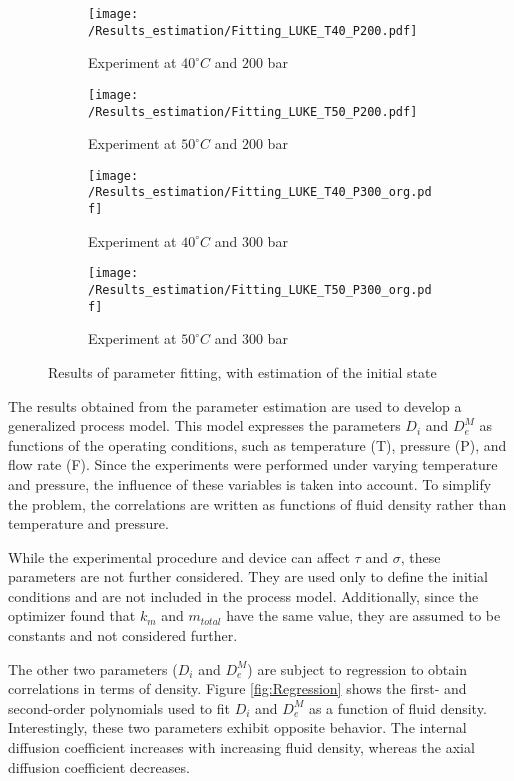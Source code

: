 \documentclass[../Article_Model_Parameters.tex]{subfiles}
\begin{document}
		\begin{figure}[!h]
		\centering
		\begin{subfigure}[b]{\columnwidth}
			\centering
			\texttt{[image: /Results\_estimation/Fitting\_LUKE\_T40\_P200.pdf]}
			\caption{Experiment at $40^\circ C$ and $200$ bar}
		\end{subfigure}
		\begin{subfigure}[b]{\columnwidth}
			\centering
			\texttt{[image: /Results\_estimation/Fitting\_LUKE\_T50\_P200.pdf]}
			\caption{Experiment at $50^\circ C$ and $200$ bar}
		\end{subfigure}
		\begin{subfigure}[b]{\columnwidth}
			\centering
			\texttt{[image: /Results\_estimation/Fitting\_LUKE\_T40\_P300\_org.pdf]}
			\caption{Experiment at $40^\circ C$ and $300$ bar}
		\end{subfigure}
		\begin{subfigure}[b]{\columnwidth}
			\centering
			\texttt{[image: /Results\_estimation/Fitting\_LUKE\_T50\_P300\_org.pdf]}
			\caption{Experiment at $50^\circ C$ and $300$ bar}
		\end{subfigure}
		\caption{Results of parameter fitting, with estimation of the initial state}
		\label{fig: estimation_results}
	\end{figure}

	The results obtained from the parameter estimation are used to develop a generalized process model. This model expresses the parameters $D_i$ and $D_e^M$ as functions of the operating conditions, such as temperature (T), pressure (P), and flow rate (F). Since the experiments were performed under varying temperature and pressure, the influence of these variables is taken into account. To simplify the problem, the correlations are written as functions of fluid density rather than temperature and pressure.
	
	While the experimental procedure and device can affect $\tau$ and $\sigma$, these parameters are not further considered. They are used only to define the initial conditions and are not included in the process model. Additionally, since the optimizer found that $k_m$ and $m_{total}$ have the same value, they are assumed to be constants and not considered further.
	
	The other two parameters ($D_i$ and $D_e^M$) are subject to regression to obtain correlations in terms of density. Figure \ref{fig:Regression} shows the first- and second-order polynomials used to fit $D_i$ and $D_e^M$ as a function of fluid density. Interestingly, these two parameters exhibit opposite behavior. The internal diffusion coefficient increases with increasing fluid density, whereas the axial diffusion coefficient decreases.
\end{document}
